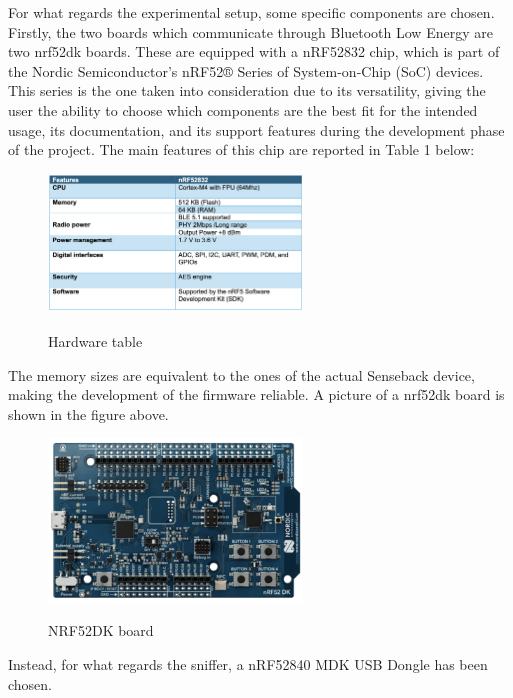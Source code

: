 \documentclass{Configuration_Files/PoliMi3i_thesis}
\begin{document}
For what regards the experimental setup, some specific components are chosen. Firstly, the two boards which communicate through Bluetooth Low Energy are two nrf52dk boards. These are equipped with a nRF52832 chip, which is part of the Nordic Semiconductor’s nRF52® Series of System-on-Chip (SoC) devices. This series is the one taken into consideration due to its versatility, giving the user the ability to choose which components are the best fit for the intended usage, its documentation, and its support features during the development phase of the project. The main features of this chip are reported in Table 1 below:

\begin{figure}[H]
    \centering
    \includegraphics[width=0.6\textwidth]{Materials/figure1}
    \label{materials_1}
    \caption{Hardware table}
\end{figure}

The memory sizes are equivalent to the ones of the actual Senseback device, making the development of the firmware reliable. A picture of a nrf52dk board is shown in the figure above.

\begin{figure}[H]
    \centering
    \includegraphics[width=0.6\textwidth]{Materials/figure2}
    \label{materials_2}
    \caption{NRF52DK board}
\end{figure}

Instead, for what regards the sniffer, a nRF52840 MDK USB Dongle has been chosen.
\end{document}
